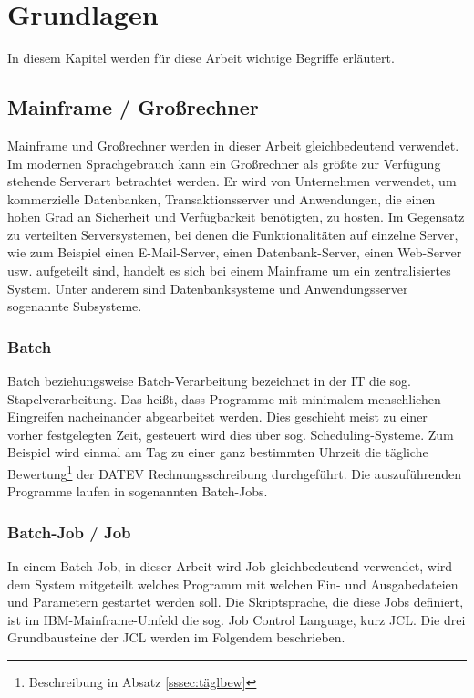 \chapter{Grundlagen}\label{ch:grundlagen}
In diesem Kapitel werden für diese Arbeit wichtige Begriffe erläutert.

\section{Mainframe / Großrechner}\label{sec:mainframe}
Mainframe und Großrechner werden in dieser Arbeit gleichbedeutend verwendet.
Im modernen Sprachgebrauch kann ein Großrechner als größte zur Verfügung stehende Serverart betrachtet werden.
Er wird von Unternehmen verwendet, um  kommerzielle Datenbanken, Transaktionsserver und Anwendungen, die einen hohen Grad an Sicherheit und Verfügbarkeit benötigten, zu hosten.
Im Gegensatz zu verteilten Serversystemen, bei denen die Funktionalitäten auf einzelne Server, wie zum Beispiel einen E-Mail-Server, einen Datenbank-Server, einen Web-Server usw. aufgeteilt sind, handelt es sich bei einem Mainframe um ein zentralisiertes System.
Unter anderem sind Datenbanksysteme und Anwendungsserver sogenannte \glqq Subsysteme\grqq.
\cite{Ebbers.2011}

\subsection{Batch}
Batch beziehungsweise Batch-Verarbeitung bezeichnet in der IT die sog. \glqq Stapelverarbeitung\grqq.
Das heißt, dass Programme mit minimalem menschlichen Eingreifen nacheinander abgearbeitet werden.
Dies geschieht meist zu einer vorher festgelegten Zeit, gesteuert wird dies über sog. \glqq Scheduling\grqq-Systeme.
Zum Beispiel wird einmal am Tag zu einer ganz bestimmten Uhrzeit die tägliche Bewertung\footnote{Beschreibung in Absatz \ref{sssec:täglbew}} der DATEV Rechnungsschreibung durchgeführt.
Die auszuführenden Programme laufen in sogenannten \glqq Batch-Jobs\grqq.
\cite{Ebbers.2011}

\subsection{Batch-Job / Job}\label{ssec:job}
In einem Batch-Job, in dieser Arbeit wird \glqq Job\grqq{} gleichbedeutend verwendet, wird dem System mitgeteilt welches Programm mit welchen Ein- und Ausgabedateien und Parametern gestartet werden soll.
Die Skriptsprache, die diese Jobs definiert, ist im IBM-Mainframe-Umfeld die sog. \glqq Job Control Language\grqq, kurz JCL.
Die drei Grundbausteine der JCL werden im Folgendem beschrieben.

